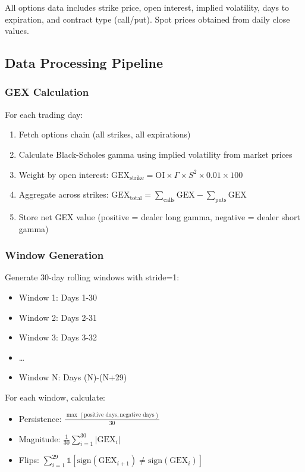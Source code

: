 All options data includes strike price, open interest, implied volatility, days to expiration, and contract type (call/put). Spot prices obtained from daily close values.

\subsection{Data Processing Pipeline}

\subsubsection{GEX Calculation}

For each trading day:
\begin{enumerate}
\item Fetch options chain (all strikes, all expirations)
\item Calculate Black-Scholes gamma using implied volatility from market prices
\item Weight by open interest: $\text{GEX}_{\text{strike}} = \text{OI} \times \Gamma \times S^2 \times 0.01 \times 100$
\item Aggregate across strikes: $\text{GEX}_{\text{total}} = \sum_{\text{calls}} \text{GEX} - \sum_{\text{puts}} \text{GEX}$
\item Store net GEX value (positive = dealer long gamma, negative = dealer short gamma)
\end{enumerate}

\subsubsection{Window Generation}

Generate 30-day rolling windows with stride=1:
\begin{itemize}
\item Window 1: Days 1-30
\item Window 2: Days 2-31
\item Window 3: Days 3-32
\item \ldots
\item Window N: Days (N)-(N+29)
\end{itemize}

For each window, calculate:
\begin{itemize}
\item Persistence: $\frac{\max(\text{positive days}, \text{negative days})}{30}$
\item Magnitude: $\frac{1}{30}\sum_{i=1}^{30} |\text{GEX}_i|$
\item Flips: $\sum_{i=1}^{29} \mathbb{1}[\text{sign}(\text{GEX}_{i+1}) \neq \text{sign}(\text{GEX}_i)]$
\end{itemize}

